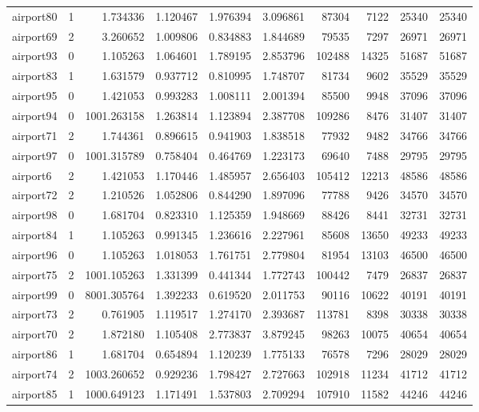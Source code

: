 \begin{longtable}{|l|r|r|r|r|r|r|r|r|r|}
airport80 & 1 & 1.734336 & 1.120467 & 1.976394 & 3.096861 & 87304 & 7122 & 25340 & 25340 \\
airport69 & 2 & 3.260652 & 1.009806 & 0.834883 & 1.844689 & 79535 & 7297 & 26971 & 26971 \\
airport93 & 0 & 1.105263 & 1.064601 & 1.789195 & 2.853796 & 102488 & 14325 & 51687 & 51687 \\
airport83 & 1 & 1.631579 & 0.937712 & 0.810995 & 1.748707 & 81734 & 9602 & 35529 & 35529 \\
airport95 & 0 & 1.421053 & 0.993283 & 1.008111 & 2.001394 & 85500 & 9948 & 37096 & 37096 \\
airport94 & 0 & 1001.263158 & 1.263814 & 1.123894 & 2.387708 & 109286 & 8476 & 31407 & 31407 \\
airport71 & 2 & 1.744361 & 0.896615 & 0.941903 & 1.838518 & 77932 & 9482 & 34766 & 34766 \\
airport97 & 0 & 1001.315789 & 0.758404 & 0.464769 & 1.223173 & 69640 & 7488 & 29795 & 29795 \\
airport6 & 2 & 1.421053 & 1.170446 & 1.485957 & 2.656403 & 105412 & 12213 & 48586 & 48586 \\
airport72 & 2 & 1.210526 & 1.052806 & 0.844290 & 1.897096 & 77788 & 9426 & 34570 & 34570 \\
airport98 & 0 & 1.681704 & 0.823310 & 1.125359 & 1.948669 & 88426 & 8441 & 32731 & 32731 \\
airport84 & 1 & 1.105263 & 0.991345 & 1.236616 & 2.227961 & 85608 & 13650 & 49233 & 49233 \\
airport96 & 0 & 1.105263 & 1.018053 & 1.761751 & 2.779804 & 81954 & 13103 & 46500 & 46500 \\
airport75 & 2 & 1001.105263 & 1.331399 & 0.441344 & 1.772743 & 100442 & 7479 & 26837 & 26837 \\
airport99 & 0 & 8001.305764 & 1.392233 & 0.619520 & 2.011753 & 90116 & 10622 & 40191 & 40191 \\
airport73 & 2 & 0.761905 & 1.119517 & 1.274170 & 2.393687 & 113781 & 8398 & 30338 & 30338 \\
airport70 & 2 & 1.872180 & 1.105408 & 2.773837 & 3.879245 & 98263 & 10075 & 40654 & 40654 \\
airport86 & 1 & 1.681704 & 0.654894 & 1.120239 & 1.775133 & 76578 & 7296 & 28029 & 28029 \\
airport74 & 2 & 1003.260652 & 0.929236 & 1.798427 & 2.727663 & 102918 & 11234 & 41712 & 41712 \\
airport85 & 1 & 1000.649123 & 1.171491 & 1.537803 & 2.709294 & 107910 & 11582 & 44246 & 44246 \\

\end{longtable}
